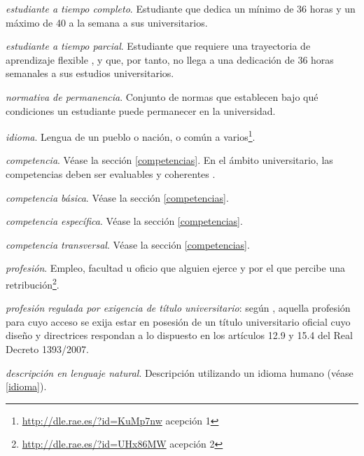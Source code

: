     \item \emph{estudiante a tiempo completo}. Estudiante que dedica un mínimo
        de 36 horas y un máximo de 40 a la semana a sus
        universitarios\cite[artículo 4, apartado 4]{rdECTS}.

    \item \emph{estudiante a tiempo parcial}. Estudiante que requiere una
        trayectoria de aprendizaje flexible \cite[artículo 7, apartado 
        2]{estatutoEstudiante}, y que, por tanto, no llega a una dedicación de
        36 horas semanales a sus estudios universitarios. 

    \item \emph{normativa de permanencia}. Conjunto de normas que establecen
        bajo qué condiciones un estudiante puede permanecer en la universidad.

    \item \label{idioma} \emph{idioma}. Lengua de un pueblo o nación, o común a
        varios\footnote{\url{http://dle.rae.es/?id=KuMp7nw} acepción 1}.

    \item \emph{competencia}. Véase la sección \ref{competencias}.
        En el ámbito universitario, las competencias deben ser
        evaluables y coherentes \cite[página 19]{guiaAneca}.

    \item \emph{competencia básica}. Véase la sección \ref{competencias}.

    \item \emph{competencia específica}. Véase la sección \ref{competencias}.

    \item \emph{competencia transversal}. Véase la sección \ref{competencias}.

    \item \emph{profesión}. Empleo, facultad u oficio que alguien ejerce y por
        el que percibe una
        retribución\footnote{\url{http://dle.rae.es/?id=UHx86MW} acepción 2}.

    \item \emph{profesión regulada por exigencia de título universitario}:
        según \cite[artículo 4, apartado c]{rdECTS}, aquella profesión para cuyo
        acceso se exija estar en posesión de un título universitario oficial
        cuyo diseño y directrices respondan a lo dispuesto en los artículos
        12.9 y 15.4 del Real Decreto 1393/2007\cite{rd1393}.

    \item \emph{descripción en lenguaje natural}. Descripción utilizando un idioma humano (véase \ref{idioma}). 

